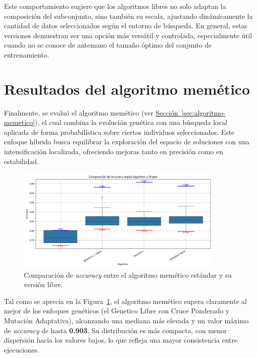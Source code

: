 Este comportamiento sugiere que los algoritmos libres no solo adaptan la composición del subconjunto, sino también su escala,
ajustando dinámicamente la cantidad de datos seleccionados según el entorno de búsqueda.
En general, estas versiones demuestran ser una opción más versátil y controlada, especialmente útil cuando no se conoce de antemano el tamaño óptimo del conjunto de entrenamiento.


\section{Resultados del algoritmo memético}\label{sec:resultados-algoritmo-memetico}
Finalmente, se evaluó el algoritmo memético (ver \hyperref[sec:algoritmo-memetico]{Sección~\ref*{sec:algoritmo-memetico}}),
el cual combina la evolución genética con una búsqueda local aplicada de forma probabilística sobre ciertos individuos seleccionados.
Este enfoque híbrido busca equilibrar la exploración del espacio de soluciones con una intensificación localizada,
ofreciendo mejoras tanto en precisión como en estabilidad.


\begin{figure}[htp]
    \centering
    \includegraphics[width=0.9\textwidth]{imagenes/evaluaciones/comparacion-memetico}
    \caption{Comparación de \textit{accuracy} entre el algoritmo memético estándar y su versión libre.}
    \label{fig:memetico_comparacion}
\end{figure}

Tal como se aprecia en la Figura~\ref{fig:memetico_comparacion}, el algoritmo memético supera claramente al mejor de los enfoques genéticos
(el Genetico Libre con Cruce Ponderado y Mutación Adaptativa), alcanzando una mediana más elevada y un valor máximo de \textit{accuracy} de hasta \textbf{0.903}.
Su distribución es más compacta, con menor dispersión hacia los valores bajos, lo que refleja una mayor consistencia entre ejecuciones.

